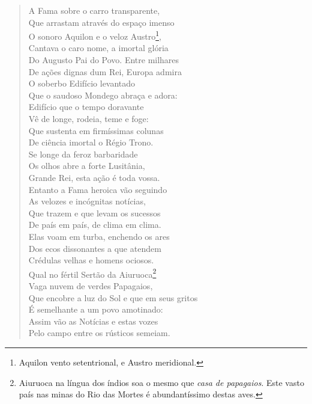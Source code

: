 \begin{verse}

A Fama sobre o carro transparente,\\		\index{\Fama}
Que arrastam através do espaço imenso\\
O sonoro Aquilon e o veloz Austro\footnote{ Aquilon vento setentrional, e Austro meridional.},\\		\index{\Aquil}
Cantava o caro nome, a imortal glória\\
Do Augusto Pai do Povo. Entre milhares\\ \index{\Aug} 	\index{\Paida}
De ações dignas dum Rei, Europa admira\\
O soberbo Edifício levantado\\
Que o saudoso Mondego abraça e adora:\\ 		\index{\Monde}
Edifício que o tempo doravante\\
Vê de longe, rodeia, teme e foge:\\
Que sustenta em firmíssimas colunas\\
De ciência imortal o Régio Trono. \\[10pt]


Se longe da feroz barbaridade\\
Os olhos abre a forte Lusitânia,\\
Grande Rei, esta ação é toda vossa. \\[10pt]


Entanto a Fama heroica vão seguindo\\		\index{\Fama}
As velozes e incógnitas notícias,\\
Que trazem e que levam os sucessos\\
De país em país, de clima em clima.\\
Elas voam em turba, enchendo os ares\\
Dos ecos dissonantes a que atendem\\
Crédulas velhas e homens ociosos.\\
Qual no fértil Sertão da Aiuruoca\footnote{ Aiuruoca na língua dos índios		
soa o mesmo que \textit{casa de papagaios}. Este vasto país nas minas do Rio das Mortes
é abundantíssimo destas aves.}\\		\index{\Aiur}
Vaga nuvem de verdes Papagaios,\\
Que encobre a luz do Sol e que em seus gritos\\
É semelhante a um povo amotinado:\\
Assim vão as Notícias e estas vozes\\
Pelo campo entre os rústicos semeiam. \\[10pt]



\end{verse}

